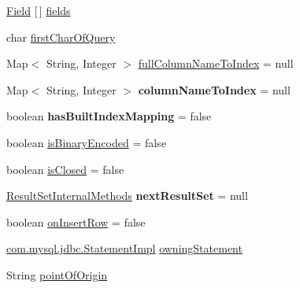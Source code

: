 \begin{DoxyCompactItemize}
\item 
\mbox{\hyperlink{classcom_1_1mysql_1_1jdbc_1_1_field}{Field}} \mbox{[}$\,$\mbox{]} \mbox{\hyperlink{classcom_1_1mysql_1_1jdbc_1_1_result_set_impl_a5da5c6ef8d035aa65884115a2f7daf67}{fields}}
\item 
char \mbox{\hyperlink{classcom_1_1mysql_1_1jdbc_1_1_result_set_impl_ad7a4981fad9749f7e42f25bdbdffeead}{first\+Char\+Of\+Query}}
\item 
Map$<$ String, Integer $>$ \mbox{\hyperlink{classcom_1_1mysql_1_1jdbc_1_1_result_set_impl_a4bb6e1d6a89775a1537be86923e8be55}{full\+Column\+Name\+To\+Index}} = null
\item 
\mbox{\label{classcom_1_1mysql_1_1jdbc_1_1_result_set_impl_a41477ad488311d5f6318a392abb7afe0}} 
Map$<$ String, Integer $>$ {\bfseries column\+Name\+To\+Index} = null
\item 
\mbox{\label{classcom_1_1mysql_1_1jdbc_1_1_result_set_impl_a3e83c48262d4c700702af674b449c711}} 
boolean {\bfseries has\+Built\+Index\+Mapping} = false
\item 
boolean \mbox{\hyperlink{classcom_1_1mysql_1_1jdbc_1_1_result_set_impl_a0704f72ebe6fe72abd6adea43bb4262f}{is\+Binary\+Encoded}} = false
\item 
boolean \mbox{\hyperlink{classcom_1_1mysql_1_1jdbc_1_1_result_set_impl_a5808c60ce9db4307bdfd90c7fb6c4ad4}{is\+Closed}} = false
\item 
\mbox{\label{classcom_1_1mysql_1_1jdbc_1_1_result_set_impl_a129ce6d671b76a85e98abb197ab9e799}} 
\mbox{\hyperlink{interfacecom_1_1mysql_1_1jdbc_1_1_result_set_internal_methods}{Result\+Set\+Internal\+Methods}} {\bfseries next\+Result\+Set} = null
\item 
boolean \mbox{\hyperlink{classcom_1_1mysql_1_1jdbc_1_1_result_set_impl_aa5d7cb01d865888ecb2f243dbb7ebc29}{on\+Insert\+Row}} = false
\item 
\mbox{\hyperlink{classcom_1_1mysql_1_1jdbc_1_1_statement_impl}{com.\+mysql.\+jdbc.\+Statement\+Impl}} \mbox{\hyperlink{classcom_1_1mysql_1_1jdbc_1_1_result_set_impl_af63a4e083b31643e2850c129d31bf03d}{owning\+Statement}}
\item 
String \mbox{\hyperlink{classcom_1_1mysql_1_1jdbc_1_1_result_set_impl_a73ec97d8b66c14b20823206da70d49f5}{point\+Of\+Origin}}
\item 

\end{DoxyCompactItemize}
